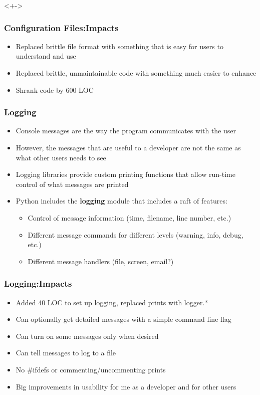 \documentclass[red, hyperref={pdfpagelabels=false}]{beamer}
\begin{document}
\begin{frame}{<+->}
  \frametitle{Configuration Files:Impacts}
  \begin{itemize}
     {  }
    \lstset{basicstyle=\ttfamily\tiny}
     {  }
    \lstset{basicstyle=\ttfamily\scriptsize}
    \item<3-> Replaced brittle file format with something that is easy for users to understand and use
    \item<4-> Replaced brittle, unmaintainable code with something much easier to enhance
    \item<5-> Shrank code by 600 LOC
  \end{itemize}
\end{frame}

\begin{frame}
  \frametitle{Logging}
  \begin{itemize}
    \item Console messages are the way the program communicates with the user
    \item However, the messages that are useful to a developer are not the
      same as what other users needs to see
    \item Logging libraries provide custom printing functions that allow run-time
      control of what messages are printed
    \item Python includes the \textbf{logging} module that includes a raft of features:
    \begin{itemize}
      \item Control of message information (time, filename, line number, etc.)
      \item Different message commands for different levels (warning, info, debug, etc.)
      \item Different message handlers (file, screen, email?)
    \end{itemize}
  \end{itemize}
\end{frame}

\begin{frame}[<+->]
  \frametitle{Logging:Impacts}
  \begin{itemize}
    \item Added 40 LOC to set up logging, replaced prints with logger.*
    \item Can optionally get detailed messages with a simple command line flag
    \item Can turn on some messages only when desired
    \item Can tell messages to log to a file
    \item No \#ifdefs or commenting/uncommenting prints
    \item Big improvements in usability for me as a developer and for other users
  \end{itemize}
\end{frame}
\end{document}
